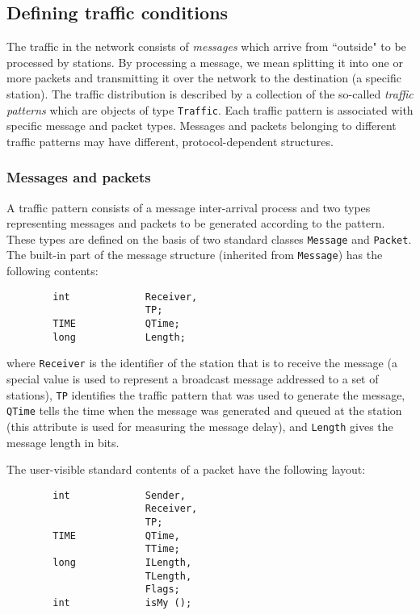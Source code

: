 \subsection{Defining traffic conditions}

The traffic in the network consists of {\em messages\/} which arrive from
``outside" to be processed by stations.
By processing a message, we mean splitting it into one or more packets
and transmitting it over the network to the destination (a specific station).
The traffic distribution is described by a collection of the so-called
{\em traffic patterns} which are objects of type {\tt Traffic}.
Each traffic pattern is associated with specific message and packet types.
Messages and packets belonging to different traffic patterns may have different,
protocol-dependent structures.

\subsubsection{Messages and packets}

A traffic pattern consists of a message inter-arrival process and two
types representing messages and packets to be
generated according to the pattern.
These types are defined on the basis of two standard classes {\tt Message} and
{\tt Packet}.
The built-in part of the message structure (inherited from {\tt Message})
has the following contents:
{\small
\begin{verbatim}
        int             Receiver,
                        TP;
        TIME            QTime;
        long            Length;
\end{verbatim} }
\noindent
where {\tt Receiver} is the identifier of the station that is to receive
the message (a special value is used to represent a broadcast message addressed
to a set of stations), {\tt TP} identifies the traffic pattern that was used to
generate the message, {\tt QTime} tells the time when the message was generated
and queued at the station (this attribute is used for measuring the
message delay),
and {\tt Length} gives the message length in bits.

The user-visible standard contents of a packet have the following layout:
{\small
\begin{verbatim}
        int             Sender,
                        Receiver,
                        TP;
        TIME            QTime,
                        TTime;
        long            ILength,
                        TLength,
                        Flags;
        int             isMy ();
\end{verbatim} }

